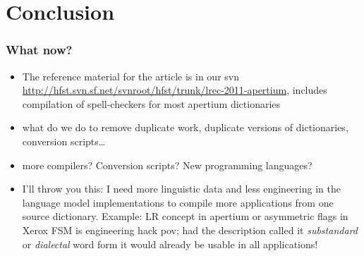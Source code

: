 \documentclass{beamer}
\begin{document}
\section{Conclusion}

\begin{frame}
    \frametitle{What now?}
    \begin{itemize}
        \item The reference material for the article is in our svn
            \url{http://hfst.svn.sf.net/svnroot/hfst/trunk/lrec-2011-apertium},
            includes compilation of spell-checkers for most apertium
            dictionaries
        \item what do we do to remove duplicate work, duplicate versions of
            dictionaries, conversion scripts\ldots
        \item more compilers? Conversion scripts? New programming languages?
        \item I'll throw you this: I need more linguistic data and less
            engineering in the language model implementations to compile
            more applications from one source dictionary. Example: LR concept
            in apertium or asymmetric flags in Xerox FSM is engineering hack 
            pov; had the description
            called it \emph{substandard} or \emph{dialectal} word form it would
            already be usable in all applications!
    \end{itemize}
\end{frame}
\end{document}
